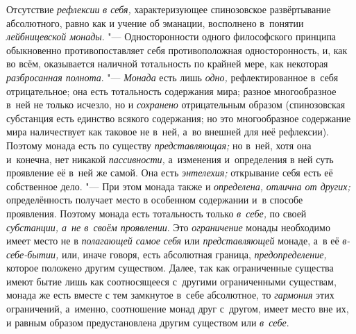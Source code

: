 Отсутствие {\em рефлексии} {\em в
себя,} характеризующее спинозовское развёртывание абсолютного, равно как и
учение об эманации, восполнено в~понятии
{\em лейбницевской монады}. "--- Односторонности одного
философского принципа обыкновенно противопоставляет себя противоположная
односторонность, и, как во всём, оказывается наличной тотальность по
крайней мере, как некоторая {\em разбросанная
полнота}. "--- {\em Монада} есть лишь
{\em одно,} рефлектированное в~себя отрицательное; она
есть тотальность содержания мира; разное многообразное в~ней не только
исчезло, но и {\em сохранено} отрицательным образом
(спинозовская субстанция есть единство всякого содержания; но это
многообразное содержание мира наличествует как таковое не в~ней, а~во
внешней для неё рефлексии). Поэтому монада есть по существу
{\em представляющая;} но в~ней, хотя она и~конечна, нет
никакой {\em пассивности,} а~изменения и~определения в
ней суть проявление её в~ней же самой. Она есть
{\em энтелехия;} открывание себя есть её собственное
дело. "--- При этом монада также и {\em определена,}
{\em отлична от других;} определённость получает место
в особенном содержании и~в способе проявления. Поэтому монада есть
тотальность только {\em в~себе,} по своей
{\em субстанции, а~не в~своём проявлении}. Это
{\em ограничение} монады необходимо имеет место не в
{\em полагающей самое себя} или
{\em представляющей} монаде, а~в её
{\em в-себе-бытии,} или, иначе говоря, есть абсолютная
граница, {\em предопределение,} которое положено
другим существом. Далее, так как ограниченные существа имеют бытие лишь как
соотносящееся с~другими ограниченными существам, монада же есть вместе с
тем замкнутое в~себе абсолютное, то {\em гармония} этих
ограничений, а~именно, соотношение монад друг с~другом, имеет место вне их,
и равным образом предустановлена другим существом или
{\em в~себе}.

